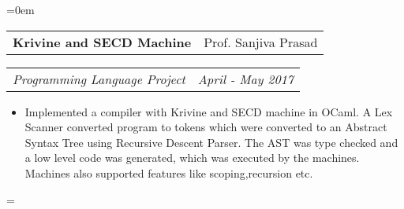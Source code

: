 \documentclass{article}
\makeatletter
\newenvironment{longversion}{}{} %
\newenvironment{absolutelynopagebreak}
  {\par\nobreak\vfil\penalty0\vfilneg
   \vtop\bgroup}
  {\par\xdef\tpd{\the\prevdepth}\egroup
   \prevdepth=\tpd}
\newcommand{\headerrow}[2]
{\begin{tabular*}{\linewidth}{l@{\extracolsep{\fill}}r}
    #1 &
    #2 \\
\end{tabular*}}
\makeatother
\begin{document}
\begin{absolutelynopagebreak}
\begin{longversion}
\begin{list} {}{\leftmargin=0em}



\item[]
\headerrow{ \textbf{Krivine and SECD Machine}} {Prof. Sanjiva Prasad}
\headerrow {\emph{Programming Language Project}}{\emph{April - May 2017}}
\begin{itemize} \item[] 
Implemented a compiler with Krivine and SECD machine in OCaml. A Lex Scanner converted program to tokens which were converted to an Abstract Syntax Tree using Recursive Descent Parser. The AST was type checked and a low level code was generated, which was executed by the machines. Machines also supported features like scoping,recursion etc.
\end{itemize}


\end{list}
\end{longversion}
\end{absolutelynopagebreak}
\end{document}
